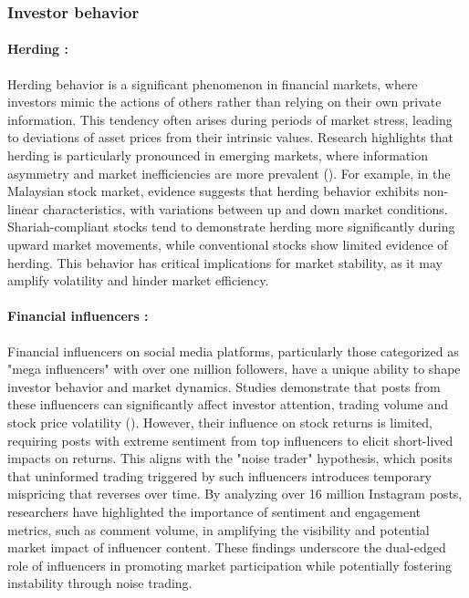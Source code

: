 \documentclass[12pt]{report}
\begin{document}
\subsubsection{Investor behavior}

\paragraph{Herding :}Herding behavior is a significant phenomenon in financial markets, where investors mimic the actions of others rather than relying on their own private information. This tendency often arises during periods of market stress, leading to deviations of asset prices from their intrinsic values. Research highlights that herding is particularly pronounced in emerging markets, where information asymmetry and market inefficiencies are more prevalent (\cite{ah_mand_herding_2023}). For example, in the Malaysian stock market, evidence suggests that herding behavior exhibits non-linear characteristics, with variations between up and down market conditions. Shariah-compliant stocks tend to demonstrate herding more significantly during upward market movements, while conventional stocks show limited evidence of herding. This behavior has critical implications for market stability, as it may amplify volatility and hinder market efficiency.

\paragraph{Financial influencers :}Financial influencers on social media platforms, particularly those categorized as "mega influencers" with over one million followers, have a unique ability to shape investor behavior and market dynamics. Studies demonstrate that posts from these influencers can significantly affect investor attention, trading volume and stock price volatility (\cite{keasey_impact_2024}). However, their influence on stock returns is limited, requiring posts with extreme sentiment from top influencers to elicit short-lived impacts on returns. This aligns with the "noise trader" hypothesis, which posits that uninformed trading triggered by such influencers introduces temporary mispricing that reverses over time. By analyzing over 16 million Instagram posts, researchers have highlighted the importance of sentiment and engagement metrics, such as comment volume, in amplifying the visibility and potential market impact of influencer content. These findings underscore the dual-edged role of influencers in promoting market participation while potentially fostering instability through noise trading.
\end{document}
